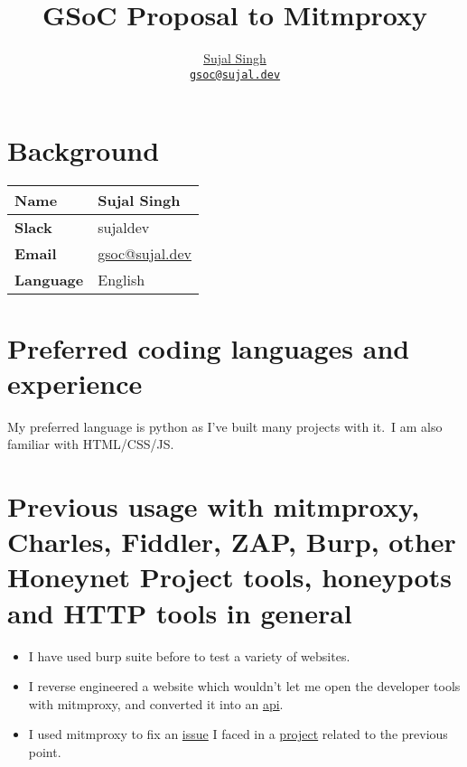\documentclass[11pt]{article}
\title{\textbf{GSoC Proposal to Mitmproxy}}
\author{
    \href{https://github.com/sujaldev}{\color{black}Sujal Singh} \\ \href{mailto:gsoc@sujal.dev}
    {\color{black}\texttt{gsoc@sujal.dev}}
}
\date{\hrule}
\begin{document}
    \maketitle




    \section*{Background}
    \label{sec:background}
    \def\arraystretch{1.6}

    \begin{tabular}{|l|l|}
        \hline
        \textbf{Name}     & {Sujal Singh}                                               \\
        \hline
        \textbf{Slack}    & {sujaldev}                                                  \\
        \hline
        \textbf{Email}    & {\href{mailto:gsoc@sujal.dev}{\color{black}gsoc@sujal.dev}} \\
        \hline
        \textbf{Language} & {English}                                                   \\
        \hline
    \end{tabular}


    \section{Preferred coding languages and experience}
    \label{sec:preferred-languages}

    My preferred language is python as I've built many projects with it.\ I am also familiar with HTML/CSS/JS.\




    \section{Previous usage with mitmproxy, Charles, Fiddler, ZAP, Burp, other Honeynet Project tools, honeypots and
    HTTP tools in general}
    \label{sec:previous-usage}

    \begin{itemize}
        \item I have used burp suite before to test a variety of websites.
        \item I reverse engineered a website which wouldn't let me open the developer tools with mitmproxy, and
        converted it into an \href{https://github.com/PlanetVormir/Redskull/}{api}.
        \item {
            I used mitmproxy to fix an
            \href{https://github.com/react-native-video/react-native-video/issues/2899#issuecomment-1291682463}{issue}
            I faced in a \href{https://github.com/PlanetVormir/BartonTV}{project} related to the
            previous point.
        }
    \end{itemize}
\end{document}
